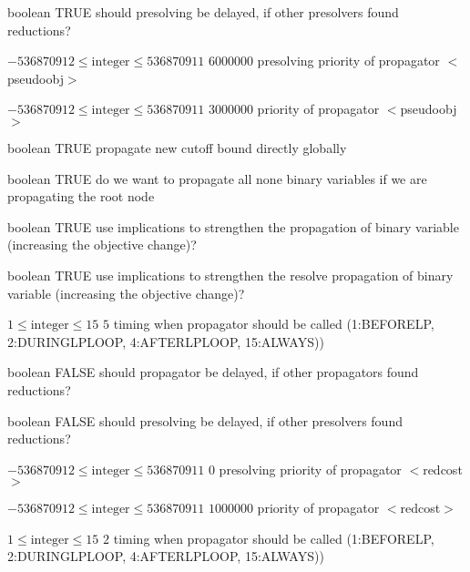 %
{boolean}%
{TRUE}%
{should presolving be delayed, if other presolvers found reductions?}%
{}

%
{$-536870912\leq\textrm{integer}\leq536870911$}%
{$6000000$}%
{presolving priority of propagator $<$pseudoobj$>$}%
{}

%
{$-536870912\leq\textrm{integer}\leq536870911$}%
{$3000000$}%
{priority of propagator $<$pseudoobj$>$}%
{}

%
{boolean}%
{TRUE}%
{propagate new cutoff bound directly globally}%
{}

%
{boolean}%
{TRUE}%
{do we want to propagate all none binary variables if we are propagating the root node}%
{}

%
{boolean}%
{TRUE}%
{use implications to strengthen the propagation of binary variable (increasing the objective change)?}%
{}

%
{boolean}%
{TRUE}%
{use implications to strengthen the resolve propagation of binary variable (increasing the objective change)?}%
{}

%
{$1\leq\textrm{integer}\leq15$}%
{$5$}%
{timing when propagator should be called (1:BEFORELP, 2:DURINGLPLOOP, 4:AFTERLPLOOP, 15:ALWAYS))}%
{}

%
{boolean}%
{FALSE}%
{should propagator be delayed, if other propagators found reductions?}%
{}

%
{boolean}%
{FALSE}%
{should presolving be delayed, if other presolvers found reductions?}%
{}

%
{$-536870912\leq\textrm{integer}\leq536870911$}%
{$0$}%
{presolving priority of propagator $<$redcost$>$}%
{}

%
{$-536870912\leq\textrm{integer}\leq536870911$}%
{$1000000$}%
{priority of propagator $<$redcost$>$}%
{}

%
{$1\leq\textrm{integer}\leq15$}%
{$2$}%
{timing when propagator should be called (1:BEFORELP, 2:DURINGLPLOOP, 4:AFTERLPLOOP, 15:ALWAYS))}%
{}

